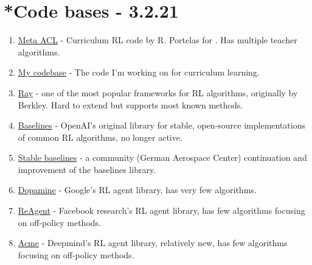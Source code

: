 \documentclass[letterpaper]{article}
\theoremstyle{definition}
\begin{document}
\section{*Code bases - 3.2.21} \label{sec:code}

\begin{enumerate}
	
	\item 
	\href{https://github.com/flowersteam/meta-acl}{Meta ACL} - Curriculum RL code by R. Portelas for \cite{Portelas2020a}. Has multiple teacher algorithms.
	
	\item 
	\href{https://github.com/lioritan/phd-work}{My codebase} - The code I'm working on for curriculum learning.
	
	\item 
	\href{https://github.com/ray-project/ray}{Ray} - one of the most popular frameworks for RL algorithms, originally by Berkley. Hard to extend but supports most known methods.
	
	\item \href{https://github.com/openai/baselines}{Baselines} - OpenAI's original library for stable, open-source implementations of common RL algorithms, no longer active.
	
	\item 
	\href{https://github.com/DLR-RM/stable-baselines3}{Stable baselines} - a community (German Aerospace Center) continuation and improvement of the baselines library.
	
	\item 
	\href{https://github.com/google/dopamine}{Dopamine} - Google's RL agent library, has very few algorithms.
	
	\item 
	\href{https://github.com/facebookresearch/ReAgent}{ReAgent} - Facebook research's RL agent library, has few algorithms focusing on off-policy methods.
	
	\item 
	\href{https://github.com/deepmind/acme}{Acme} - Deepmind's RL agent library, relatively new, has few algorithms focusing on off-policy methods. 
	
\end{enumerate}

\end{document}
